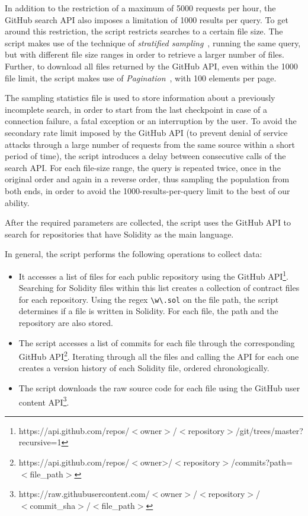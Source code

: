\documentclass[10pt,conference]{IEEEtran}
\begin{document}
\begin{itemize}
		In addition to the restriction of a maximum of 5000 requests per hour, the GitHub search API also imposes a limitation of 1000 results per query. To get around this restriction, the script restricts searches to a certain file size. The script makes use of the technique of \textit{stratified sampling}~\cite{stratifiedsampling}, running the same query, but with different file size ranges in order to retrieve a larger number of files. Further, to download all files returned by the GitHub API, even within the 1000 file limit, the script makes use of \textit{Pagination}~\cite{pagination}, with 100 elements per page.
		
		The sampling statistics file is used to store information about a previously incomplete search, in order to start from the last checkpoint in case of a connection failure, a fatal exception or an interruption by the user. To avoid the secondary rate limit imposed by the GitHub API (to prevent denial of service attacks through a large number of requests from the same source within a short period of time), the script introduces a delay between consecutive calls of the search API. For each file-size range, the query is repeated twice, once in the original order and again in a reverse order, thus sampling the population from both ends, in order to avoid the 1000-results-per-query limit to the best of our ability.
		
		After the required parameters are collected, the script uses the GitHub API to search for repositories that have Solidity as the main language. 
		
		In general, the script performs the following operations to collect data:
		\begin{itemize}
			\item It accesses a list of files for each public repository using the GitHub API\footnote{https://api.github.com/repos/$<$owner$>$/$<$repository$>$/git/trees/master?\\recursive=1}. Searching for Solidity files within this list creates a collection of contract files for each repository. Using the regex \texttt{\textbackslash w\textbackslash .sol} on the file path, the script determines if a file is written in Solidity. For each file, the path and the repository are also stored.
			\item The script accesses a list of commits for each file through the corresponding GitHub API\footnote{ https://api.github.com/repos/$<$owner>/$<$repository$>$/commits?path=\\$<$file\_path$>$}. Iterating through all the files and calling the API for each one creates a version history of each Solidity file, ordered chronologically.
			\item The script downloads the raw source code for each file using the GitHub user content API\footnote{ https://raw.githubusercontent.com/$<$owner$>$/$<$repository$>$/\\$<$commit\_sha$>$/$<$file\_path$>$}.
		\end{itemize}
		

\end{itemize}
\end{document}
